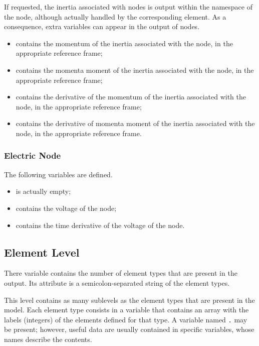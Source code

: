 If requested, the inertia associated with  nodes is output
within the namespace of the node, although actually handled
by the corresponding  element.
As a consequence, extra variables can appear in the output
of  nodes.
\begin{itemize}
\item {} contains the momentum of the inertia
associated with the node, in the appropriate reference frame;

\item {} contains the momenta moment of the inertia
associated with the node, in the appropriate reference frame;

\item {} contains the derivative of the momentum
of the inertia associated with the node, in the appropriate reference frame;

\item {} contains the derivative of momenta moment
of the inertia associated with the node, in the appropriate reference frame.
\end{itemize}


\subsubsection{Electric Node}
\label{sec:NetCDF:Node:Electric Node}
The following variables are defined.
\begin{itemize}
\item {} is actually empty;

\item {} contains the voltage of the node;

\item {} contains the time derivative of the voltage of the node.
\end{itemize}


\subsection{Element Level}
There variable  contains the number of element types that are present in the output.
Its attribute  is a semicolon-separated string of the element types.

This level contains as many sublevels as the element types
that are present in the model.
Each element type consists in a variable that contains an array
with the labels (integers) of the elements defined for that type.
A variable named \texttt{.} may be present; however,
useful data are usually contained in specific variables,
whose names describe the contents.

